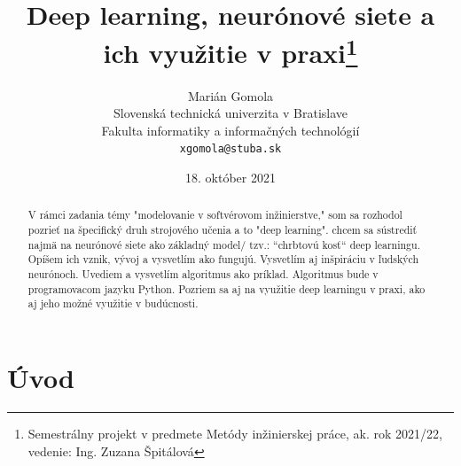 \documentclass[10pt,twoside,slovak,a4paper]{article}
\title{Deep learning, neurónové siete a ich využitie v praxi\thanks{Semestrálny projekt v predmete Metódy inžinierskej práce, ak. rok 2021/22, vedenie: Ing. Zuzana Špitálová}} %
\author{Marián Gomola\\[2pt]
	{\small Slovenská technická univerzita v Bratislave}\\
	{\small Fakulta informatiky a informačných technológií}\\
	{\small \texttt{xgomola@stuba.sk}}
	}
\date{\small 18. október 2021}
\begin{document}
\maketitle


\begin{abstract}
V rámci zadania témy "modelovanie v softvérovom inžinierstve," som sa rozhodol pozrieť na špecifický druh strojového učenia a to "deep learning". 
chcem sa sústrediť najmä na neurónové siete ako základný model/ tzv.: “chrbtovú kosť“ deep learningu. 
Opíšem ich vznik, vývoj a vysvetlím ako fungujú. Vysvetlím aj inšpiráciu v ľudských neurónoch.
Uvediem a vysvetlím algoritmus ako príklad. Algoritmus bude v programovacom jazyku Python.
Pozriem sa aj na využitie deep learningu v praxi, ako aj jeho možné využitie v budúcnosti. 
\end{abstract}
\pagebreak
\section{Úvod}
\end{document}
